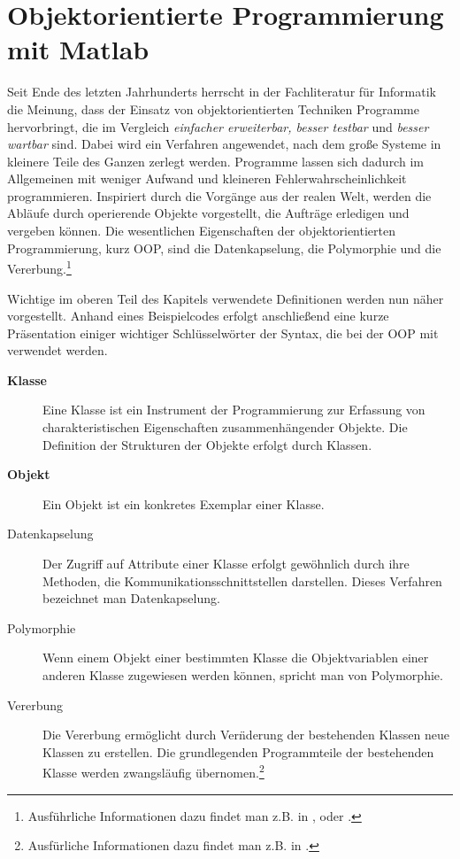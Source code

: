 \section{Objektorientierte Programmierung mit Matlab}

Seit Ende des letzten Jahrhunderts herrscht in der Fachliteratur für Informatik
die Meinung, dass der Einsatz von objektorientierten Techniken Programme
hervorbringt, die im Vergleich \textit{einfacher erweiterbar, besser testbar}
und \textit{besser wartbar} sind. Dabei wird
ein Verfahren angewendet, nach dem große Systeme in kleinere Teile des Ganzen
zerlegt werden. Programme lassen sich dadurch im Allgemeinen mit weniger Aufwand
und kleineren Fehlerwahrscheinlichkeit programmieren. Inspiriert durch die
Vorgänge aus der realen Welt, werden die Abläufe durch operierende Objekte
vorgestellt, die Aufträge erledigen und vergeben können. Die wesentlichen
Eigenschaften der objektorientierten Programmierung, kurz
OOP, sind die Datenkapselung, die
Polymorphie und die Vererbung.\footnote{ Ausführliche Informationen dazu findet
man z.B.  in \cite{OOP},\cite{java} oder \cite{python}.}

Wichtige im oberen Teil des Kapitels verwendete Definitionen werden nun n\"aher
vorgestellt. Anhand eines
Beispielcodes erfolgt anschlie\ss end eine kurze Pr\"asentation einiger
wichtiger Schl\"usselw\"orter der Syntax, die bei der OOP mit \matlab verwendet
werden.



\begin{description}

	\item[\textbf{Klasse}] Eine Klasse ist ein Instrument der
	Programmierung zur Erfassung von charakteristischen Eigenschaften
	zusammenh\"angender Objekte. Die Definition der Strukturen der Objekte
	erfolgt durch Klassen.

	\item[\textbf{Objekt}] Ein Objekt ist ein konkretes Exemplar einer
	Klasse.

	\item[Datenkapselung] Der Zugriff auf Attribute einer Klasse erfolgt
	gew\"ohnlich durch ihre Methoden, die Kommunikationsschnittstellen
	darstellen. Dieses Verfahren bezeichnet man Datenkapselung.

	\item[Polymorphie] Wenn einem Objekt einer bestimmten Klasse die
	Objektvariablen einer anderen Klasse zugewiesen werden k\"onnen, spricht
	man von Polymorphie.

	\item[Vererbung] Die Vererbung erm\"oglicht durch Ver\"nderung der
	bestehenden Klassen neue Klassen zu erstellen. Die grundlegenden
	Programmteile der bestehenden Klasse werden zwangsl\"aufig
	\"ubernomen.\footnote{ Ausf\"urliche Informationen dazu findet man z.B.
	in \cite{pepperOOP}.}

\end{description}

